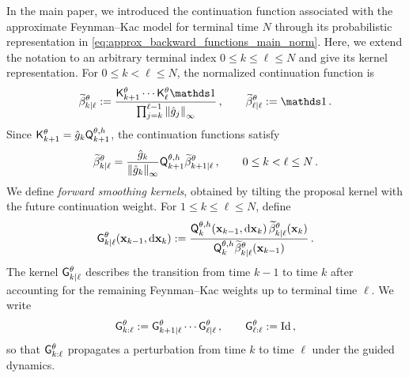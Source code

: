 \documentclass[11pt]{article}
\theoremstyle{plain}
\theoremstyle{definition}
\theoremstyle{remark}
\begin{document}
In the main paper, we introduced the continuation function associated with the approximate Feynman--Kac model for terminal time $N$ through its probabilistic representation in \eqref{eq:approx_backward_functions_main_norm}. Here, we extend the notation to an arbitrary terminal index $0\le k\le\ell\le N$ and give its kernel representation.
%
For $0\le k<\ell\le N$,  the normalized continuation function is
\begin{equation}
\label{eq:approx_backward_functions_app}
\normbackwardfun{k}{\ell}[\theta] \eqdef \frac{ \unpredictive{k+1}[\theta] \cdots \unpredictive{\ell}[\theta]\un }{ \prod_{j=k}^{\ell-1} \norminfty{\approxpot{j}} } \eqsp, \qquad \normbackwardfun{\ell}{\ell}[\theta] \eqdef \un \eqsp.
\end{equation}
%
Since $\unpredictive{k+1}[\theta] =\approxpot{k}\mk{k+1}[\theta,h]$,
the continuation functions satisfy
\begin{equation}
\label{eq:continuation_recursion}
\normbackwardfun{k}{\ell}[\theta]
= \frac{\approxpot{k}}{\norminfty{\approxpot{k}}} \mk{k+1}[\theta,h] \normbackwardfun{k+1}{\ell}[\theta] \eqsp, \qquad 0\le k<\ell\le N \eqsp.
\end{equation}
%
We define \emph{forward smoothing kernels}, obtained by tilting the proposal kernel with the future continuation weight. For $1\le k \le \ell \le N$, define
\begin{equation} \label{eq:approx_smoothing_kernel_main}
\fsmk{k}{\ell}[\theta][\x_{k-1}][\rmd \x_k] \eqdef \frac{ \mk{k}[\theta,h][\x_{k-1}][\rmd \x_k]\, \normbackwardfun{k}{\ell}[\theta][\x_k] }{ \mk{k}[\theta,h]\normbackwardfun{k}{\ell}[\theta](\x_{k-1}) } \eqsp.
\end{equation}
The kernel $\fsmk{k}{\ell}[\theta]$ describes the transition from
time $k-1$ to time $k$ after accounting for the remaining
Feynman--Kac weights up to terminal time $\ell$. We write
$$
\prodfsmk{k}{\ell}[\theta] \eqdef \fsmk{k+1}{\ell}[\theta] \cdots \fsmk{\ell}{\ell}[\theta] \eqsp, \qquad \prodfsmk{\ell}{\ell}[\theta] \eqdef \operatorname{Id} \eqsp,
$$
so that $\prodfsmk{k}{\ell}[\theta]$ propagates a perturbation from
time $k$ to time $\ell$ under the guided dynamics.
\end{document}
